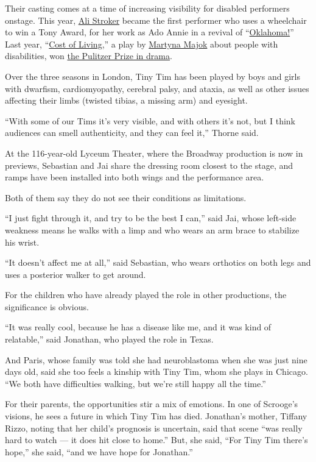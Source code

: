 Their casting comes at a time of increasing visibility for disabled
performers onstage. This year, \href{https://nyti.ms/2XfQNJP}{Ali
Stroker} became the first performer who uses a wheelchair to win a Tony
Award, for her work as Ado Annie in a revival of
``\href{https://nyti.ms/2I2dF8p}{Oklahoma!}'' Last year,
``\href{https://nyti.ms/2sVkNaV}{Cost of Living},'' a play by
\href{https://nyti.ms/1opad9v}{Martyna Majok} about people with
disabilities, won
\href{https://www.pulitzer.org/winners/martyna-majok}{the Pulitzer Prize
in drama}.

Over the three seasons in London, Tiny Tim has been played by boys and
girls with dwarfism, cardiomyopathy, cerebral palsy, and ataxia, as well
as other issues affecting their limbs (twisted tibias, a missing arm)
and eyesight.

``With some of our Tims it's very visible, and with others it's not, but
I think audiences can smell authenticity, and they can feel it,'' Thorne
said.

At the 116-year-old Lyceum Theater, where the Broadway production is now
in previews, Sebastian and Jai share the dressing room closest to the
stage, and ramps have been installed into both wings and the performance
area.

Both of them say they do not see their conditions as limitations.

``I just fight through it, and try to be the best I can,'' said Jai,
whose left-side weakness means he walks with a limp and who wears an arm
brace to stabilize his wrist.

``It doesn't affect me at all,'' said Sebastian, who wears orthotics on
both legs and uses a posterior walker to get around.

For the children who have already played the role in other productions,
the significance is obvious.

``It was really cool, because he has a disease like me, and it was kind
of relatable,'' said Jonathan, who played the role in Texas.

And Paris, whose family was told she had neuroblastoma when she was just
nine days old, said she too feels a kinship with Tiny Tim, whom she
plays in Chicago. ``We both have difficulties walking, but we're still
happy all the time.''

For their parents, the opportunities stir a mix of emotions. In one of
Scrooge's visions, he sees a future in which Tiny Tim has died.
Jonathan's mother, Tiffany Rizzo, noting that her child's prognosis is
uncertain, said that scene ``was really hard to watch --- it does hit
close to home.'' But, she said, ``For Tiny Tim there's hope,'' she said,
``and we have hope for Jonathan.''

